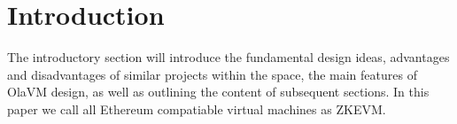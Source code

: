 \section{Introduction} \label{sec:introduction}
The introductory section will introduce the fundamental design ideas, advantages and disadvantages of similar projects within the space, the main features of OlaVM design, as well as outlining the content of subsequent sections. In this paper we call all Ethereum compatiable virtual machines as ZKEVM.




